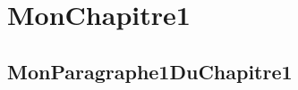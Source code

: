 \documentclass{report}
\begin{document}
\chapter{MonChapitre1}

\section{MonParagraphe1DuChapitre1}

\lipsum[0-10]
\end{document}
